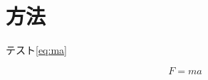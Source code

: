\documentclass[../../../main]{subfiles}
\begin{document}
\section{方法}

テスト\ref{eq:ma}

\begin{equation}\label{eq:ma}
    F = ma
\end{equation}
\end{document}
